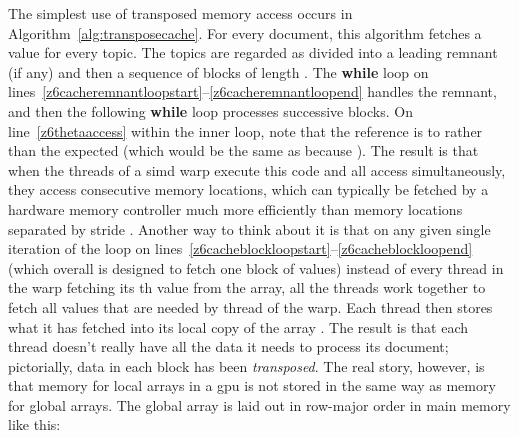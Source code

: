 \documentclass[10pt,nohyperref]{sigplanconf}
\begin{document}
The simplest use of transposed memory access occurs in Algorithm~\ref{alg:transposecache}.
For every document, this algorithm fetches a  value for every topic.
The topics are regarded as divided into a leading remnant (if any) and then a sequence
of blocks of length .  The {\bf while} loop on lines~\hbox{\ref{z6cacheremnantloopstart}--\ref{z6cacheremnantloopend}}
handles the remnant, and then the following {\bf while} loop processes successive blocks.
On line~\ref{z6thetaaccess} within the inner loop,
note that the reference is to  rather than the expected 
(which would be the same as  because ).  The result is that when
the  threads of a {\sc simd} warp execute this code and all access  simultaneously, they access
 consecutive memory locations, which can typically be fetched by a hardware memory controller
much more efficiently than  memory locations separated by stride .
Another way to think about it is that on any given single iteration of the loop on
lines~\hbox{\ref{z6cacheblockloopstart}--\ref{z6cacheblockloopend}}
(which overall is designed to fetch one  block of  values)
instead of every thread in the warp fetching its th value from the  array,
all the threads work together to fetch all  values that are needed by thread  of the warp.
Each thread then stores what it has fetched into its local copy of the array .
The result is that each thread doesn't really have all the  data it needs to process its
document; pictorially, data in each  block has been \emph{transposed}.
The real story, however, is that memory for local arrays in a {\sc gpu} is not stored in the same way as memory for global arrays.
The global array  is laid out in row-major order in main memory like this:
\end{document}
